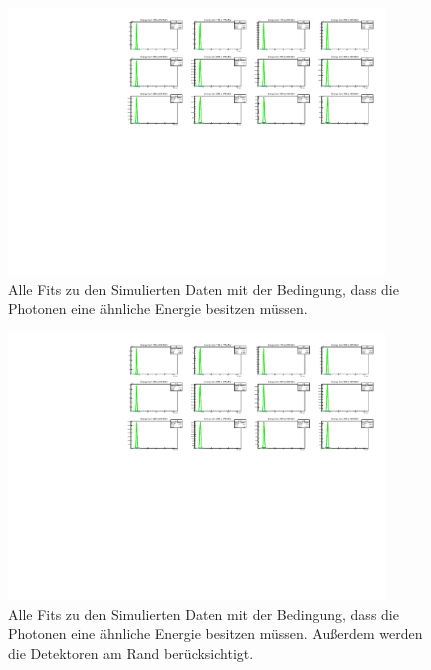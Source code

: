 \documentclass[a4paper,11pt,oneside,final,german,openbib,pdftex]{scrbook}
\begin{document}
{\begin{appendix}
\begin{figure}[h!]
	\begin{center}
		\includegraphics[width=100mm]{NewCalib/20171904SimNoCutAllFits}
		\caption[Simulation: Alle Fits; Keine weiteren Bedingungen]{Alle Fits zu den Simulierten Daten mit der Bedingung, dass die Photonen eine \"ahnliche Energie besitzen m\"ussen.}
		\label{fig:Sim-No-Cut-All-Fits}
	\end{center}
\end{figure}


\begin{figure}[h!]
	\begin{center}
		\includegraphics[width=100mm]{NewCalib/20171904Sim30DegreeCutAllFits}
		\caption[Simulation: Alle Fits ohne Detektoren am Rand]{Alle Fits zu den Simulierten Daten mit der Bedingung, dass die Photonen eine \"ahnliche Energie besitzen m\"ussen. Au{\ss}erdem werden die Detektoren am Rand ber\"ucksichtigt.}
		\label{fig:Sim-30-Degree-Cut-All-Fits}
	\end{center}
\end{figure}


\end{appendix}}
\end{document}
